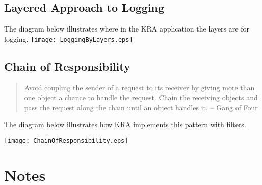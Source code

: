 \documentclass[12pt]{report}
\begin{document}
\subsection{Layered Approach to Logging}
The diagram below illustrates where in the KRA application the layers are for logging.
\texttt{[image: LoggingByLayers.eps]}
\newpage
\subsection{Chain of Responsibility}
\begin{quote}
Avoid coupling the sender of a request to its receiver by giving more than one object a chance to handle
the request. Chain the receiving objects and pass the request along the chain until an object handles it. -- Gang of Four\end{quote}

The diagram below illustrates how KRA implements this pattern with filters.

\texttt{[image: ChainOfResponsibility.eps]}
\section{Notes}
\end{document}
